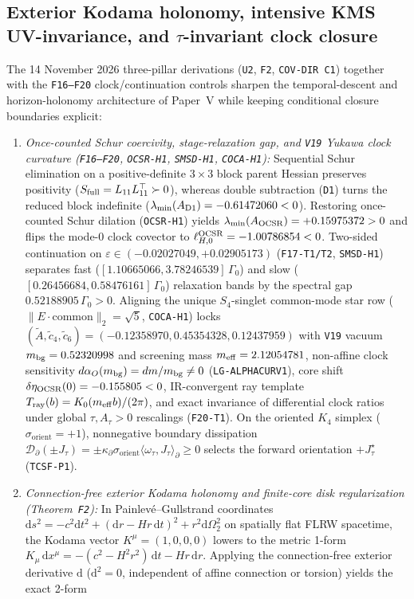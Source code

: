 \documentclass[11pt]{article}
\begin{document}
\subsection{Exterior Kodama holonomy, intensive KMS UV-invariance, and $\tau$-invariant clock closure}
\label{sec:foundations-f16-f20-paperv-20261112}\hypertarget{f16f20paperv}{}
The 14 November 2026 three-pillar derivations (\texttt{U2}, \texttt{F2}, \texttt{COV-DIR C1}) together with the \texttt{F16--F20} clock/continuation controls sharpen the temporal-descent and horizon-holonomy architecture of Paper~V while keeping conditional closure boundaries explicit:
\begin{enumerate}
\item \emph{Once-counted Schur coercivity, stage-relaxation gap, and \texttt{V19} Yukawa clock curvature (\texttt{F16--F20}, \texttt{OCSR-H1}, \texttt{SMSD-H1}, \texttt{COCA-H1}):} Sequential Schur elimination on a positive-definite $3\times 3$ block parent Hessian preserves positivity ($S_{\rm full}=L_{11}L_{11}^\top\succ 0$), whereas double subtraction (\texttt{D1}) turns the reduced block indefinite ($\lambda_{\min}(A_{\rm D1})=-0.61472060<0$). Restoring once-counted Schur dilation (\texttt{OCSR-H1}) yields $\lambda_{\min}(A_{\rm OCSR})=+0.15975372>0$ and flips the mode-0 clock covector to $\ell_{H,0}^{\rm OCSR}=-1.00786854<0$. Two-sided continuation on $\varepsilon\in(-0.02027049,+0.02905173)$ (\texttt{F17-T1/T2}, \texttt{SMSD-H1}) separates fast ($[1.10665066,3.78246539]\,\Gamma_0$) and slow ($[0.26456684,0.58476161]\,\Gamma_0$) relaxation bands by the spectral gap $0.52188905\,\Gamma_0>0$. Aligning the unique $S_4$-singlet common-mode star row ($\|E\cdot\text{common}\|_2=\sqrt{5}$, \texttt{COCA-H1}) locks $(\tilde A,\tilde c_4,\tilde c_6)=(-0.12358970,0.45354328,0.12437959)$ with \texttt{V19} vacuum $m_{\rm bg}=0.52320998$ and screening mass $m_{\rm eff}=2.12054781$, non-affine clock sensitivity $d\alpha_O(m_{\rm bg})=dm/m_{\rm bg}\neq 0$ (\texttt{LG-ALPHACURV1}), core shift $\delta\eta_{\rm OCSR}(0)=-0.155805<0$, IR-convergent ray template $T_{\rm ray}(b)=K_0(m_{\rm eff}b)/(2\pi)$, and exact invariance of differential clock ratios under global $\tau,A_\tau>0$ rescalings (\texttt{F20-T1}). On the oriented $K_4$ simplex ($\sigma_{\mathrm{orient}}=+1$), nonnegative boundary dissipation $\mathcal{D}_{\partial}(\pm J_\tau)=\pm\kappa_{\partial}\sigma_{\mathrm{orient}}\langle\omega_\tau,J_\tau\rangle_{\partial}\ge 0$ selects the forward orientation $+J_\tau^\star$ (\texttt{TCSF-P1}).
\item \emph{Connection-free exterior Kodama holonomy and finite-core disk regularization (Theorem~\texttt{F2}):} In Painlev\'e--Gullstrand coordinates $\mathrm{d}s^2=-c^2\mathrm{d}t^2+(\mathrm{d}r-Hr\,\mathrm{d}t)^2+r^2\mathrm{d}\Omega_2^2$ on spatially flat FLRW spacetime, the Kodama vector $K^\mu=(1,0,0,0)$ lowers to the metric 1-form $K_\mu\,\mathrm{d}x^\mu=-(c^2-H^2r^2)\,\mathrm{d}t-Hr\,\mathrm{d}r$. Applying the connection-free exterior derivative $\mathrm{d}$ ($\mathrm{d}^2=0$, independent of affine connection or torsion) yields the exact 2-form

\end{enumerate}
\end{document}
